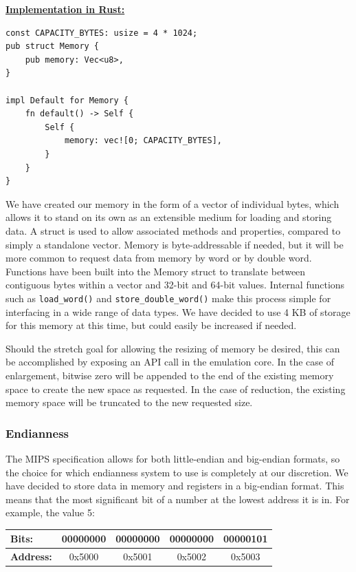 \documentclass[
    paper=letter,
    parskip=half,
    fontsize=12pt,
    titlepage=firstiscover,
    toc=bibliography,
    numbers=endperiod
]{scrartcl}
\begin{document}
\underline{\textbf{Implementation in Rust:}}
\begin{verbatim}
const CAPACITY_BYTES: usize = 4 * 1024;
pub struct Memory {
    pub memory: Vec<u8>,
}

impl Default for Memory {
    fn default() -> Self {
        Self {
            memory: vec![0; CAPACITY_BYTES],
        }
    }
}
\end{verbatim}

We have created our memory in the form of a vector of individual bytes,
which allows it to stand on its own as an extensible medium for loading
and storing data. A struct is used to allow associated methods and
properties, compared to simply a standalone vector. Memory is
byte-addressable if needed, but it will be more common to request data
from memory by word or by double word. Functions have been built into
the Memory struct to translate between contiguous bytes within a vector
and 32-bit and 64-bit values. Internal functions such as
\texttt{load\_word()} and \texttt{store\_double\_word()} make this
process simple for interfacing in a wide range of data types. We have
decided to use 4 KB of storage for this memory at this time, but could
easily be increased if needed.

Should the stretch goal for allowing the resizing of memory be desired,
this can be accomplished by exposing an API call in the emulation core.
In the case of enlargement, bitwise zero will be appended to the end of
the existing memory space to create the new space as requested. In the
case of reduction, the existing memory space will be truncated to the
new requested size.

\subsubsection{Endianness}

The MIPS specification allows for both little-endian and big-endian
formats, so the choice for which endianness system to use is completely
at our discretion. We have decided to store data in memory and registers
in a big-endian format. This means that the most significant bit of a
number at the lowest address it is in. For example, the value 5:

\begin{tabularx}{\textwidth}{|l|c|c|c|c|}
    \hline
    \textbf{Bits:}    & 00000000 & 00000000 & 00000000 & 00000101 \\\hline
    \textbf{Address:} & 0x5000   & 0x5001   & 0x5002   & 0x5003   \\\hline
\end{tabularx}
\end{document}
